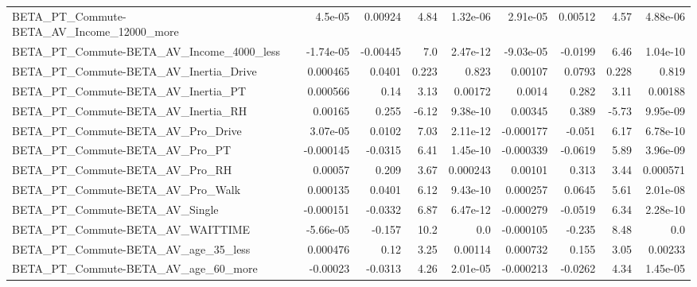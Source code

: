 \begin{tabular}{lrrrrrrrr}
BETA\_PT\_Commute-BETA\_AV\_Income\_12000\_more          &     4.5e-05 &      0.00924 &     4.84 & 1.32e-06 &   2.91e-05 &     0.00512 &         4.57 &      4.88e-06 \\
BETA\_PT\_Commute-BETA\_AV\_Income\_4000\_less           &   -1.74e-05 &     -0.00445 &      7.0 & 2.47e-12 &  -9.03e-05 &     -0.0199 &         6.46 &      1.04e-10 \\
BETA\_PT\_Commute-BETA\_AV\_Inertia\_Drive              &    0.000465 &       0.0401 &    0.223 &    0.823 &    0.00107 &      0.0793 &        0.228 &         0.819 \\
BETA\_PT\_Commute-BETA\_AV\_Inertia\_PT                 &    0.000566 &         0.14 &     3.13 &  0.00172 &     0.0014 &       0.282 &         3.11 &       0.00188 \\
BETA\_PT\_Commute-BETA\_AV\_Inertia\_RH                 &     0.00165 &        0.255 &    -6.12 & 9.38e-10 &    0.00345 &       0.389 &        -5.73 &      9.95e-09 \\
BETA\_PT\_Commute-BETA\_AV\_Pro\_Drive                  &    3.07e-05 &       0.0102 &     7.03 & 2.11e-12 &  -0.000177 &      -0.051 &         6.17 &      6.78e-10 \\
BETA\_PT\_Commute-BETA\_AV\_Pro\_PT                     &   -0.000145 &      -0.0315 &     6.41 & 1.45e-10 &  -0.000339 &     -0.0619 &         5.89 &      3.96e-09 \\
BETA\_PT\_Commute-BETA\_AV\_Pro\_RH                     &     0.00057 &        0.209 &     3.67 & 0.000243 &    0.00101 &       0.313 &         3.44 &      0.000571 \\
BETA\_PT\_Commute-BETA\_AV\_Pro\_Walk                   &    0.000135 &       0.0401 &     6.12 & 9.43e-10 &   0.000257 &      0.0645 &         5.61 &      2.01e-08 \\
BETA\_PT\_Commute-BETA\_AV\_Single                     &   -0.000151 &      -0.0332 &     6.87 & 6.47e-12 &  -0.000279 &     -0.0519 &         6.34 &      2.28e-10 \\
BETA\_PT\_Commute-BETA\_AV\_WAITTIME                   &   -5.66e-05 &       -0.157 &     10.2 &      0.0 &  -0.000105 &      -0.235 &         8.48 &           0.0 \\
BETA\_PT\_Commute-BETA\_AV\_age\_35\_less                &    0.000476 &         0.12 &     3.25 &  0.00114 &   0.000732 &       0.155 &         3.05 &       0.00233 \\
BETA\_PT\_Commute-BETA\_AV\_age\_60\_more                &    -0.00023 &      -0.0313 &     4.26 & 2.01e-05 &  -0.000213 &     -0.0262 &         4.34 &      1.45e-05 \\

\end{tabular}
